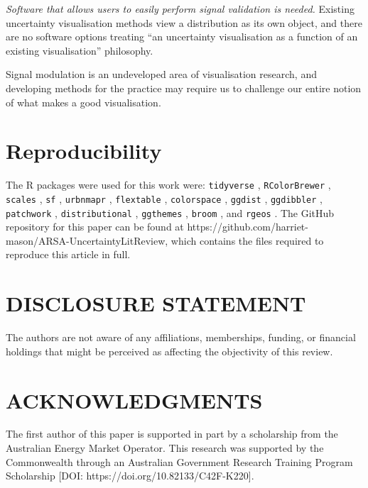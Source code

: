 \documentclass[]{ar-1col-S2O}
\begin{document}
\emph{Software that allows users to easily perform signal validation is
needed.} Existing uncertainty visualisation methods view a distribution
as its own object, and there are no software options treating ``an
uncertainty visualisation as a function of an existing visualisation''
philosophy.

Signal modulation is an undeveloped area of visualisation research, and
developing methods for the practice may require us to challenge our
entire notion of what makes a good visualisation.

\section*{Reproducibility}\label{reproducibility}

The R packages were used for this work were: \texttt{tidyverse}
\citep{tidyverse}, \texttt{RColorBrewer} \citep{RColorBrewer},
\texttt{scales} \citep{scales}, \texttt{sf} \citep{sf},
\texttt{urbnmapr} \citep{urbnmapr}, \texttt{flextable}
\citep{flextable}, \texttt{colorspace} \citep{colorspace},
\texttt{ggdist} \citep{Kay2023}, \texttt{ggdibbler} \citep{ggdibbler},
\texttt{patchwork} \citep{patchwork}, \texttt{distributional}
\citep{distributional}, \texttt{ggthemes} \citep{ggthemes},
\texttt{broom} \citep{broom}, and \texttt{rgeos} \citep{rgeos}. The
GitHub repository for this paper can be found at
https://github.com/harriet-mason/ARSA-UncertaintyLitReview, which
contains the files required to reproduce this article in full.

\hypertarget{disclosure-statement}{%
\section*{DISCLOSURE STATEMENT}\label{disclosure-statement}}
The authors are not aware of any affiliations, memberships, funding, or
financial holdings that might be perceived as affecting the objectivity
of this review.

\hypertarget{acknowledgments}{%
\section*{ACKNOWLEDGMENTS}\label{acknowledgments}}
The first author of this paper is supported in part by a scholarship
from the Australian Energy Market Operator. This research was supported
by the Commonwealth through an Australian Government Research Training
Program Scholarship {[}DOI: https://doi.org/10.82133/C42F-K220{]}.

  
\end{document}
